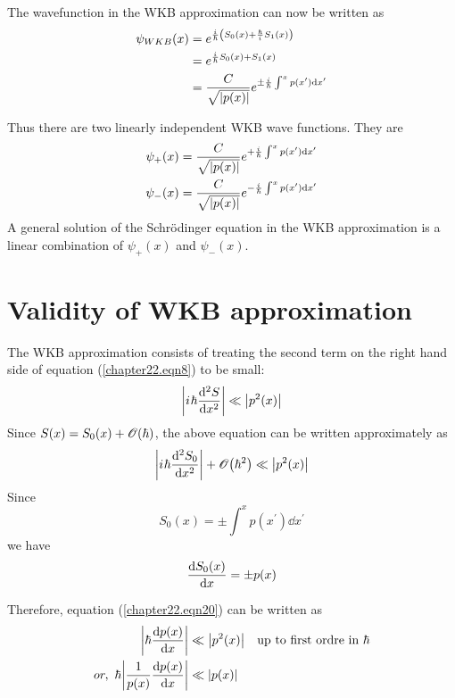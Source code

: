 The wavefunction in the WKB approximation can now be written as
\begin{align}
\psi_{WKB}(x) &= e^{\frac{{i\mkern1mu}}{\hbar} \qty(S_0(x) + \frac{\hbar}{{i\mkern1mu}} S_1(x))}  \nonumber\\
&= e^{\frac{{i\mkern1mu}}{\hbar} S_0(x) + S_1(x)} \nonumber\\
\label{chapter22.eqn16}
&= \frac{C}{\sqrt{\abs{p(x)}}} e^{\pm \frac{{i\mkern1mu}}{\hbar}\int^{x} p(x^\prime) \dd{x^\prime}}
\end{align}

Thus there are two linearly independent WKB wave functions. They are
\begin{align}
\label{chapter22.eqn17}
	\psi_+(x) &= \frac{C}{\sqrt{\abs{p(x)}}} e^{+ \frac{{i\mkern1mu}}{\hbar}\int^{x} p(x^\prime) \dd{x^\prime}} \\
\label{chapter22.eqn18}
	\psi_-(x) &= \frac{C}{\sqrt{\abs{p(x)}}} e^{- \frac{{i\mkern1mu}}{\hbar}\int^{x} p(x^\prime) \dd{x^\prime}}
\end{align}
A general solution of the Schr\"{o}dinger equation in the WKB approximation is a linear combination of $\psi_+(x)$ and $\psi_-(x)$.

\section{Validity of WKB approximation}
The WKB approximation consists of treating the second term on the right hand side of equation (\ref{chapter22.eqn8}) to be small:
\begin{equation}
\label{chapter22.eqn19}
\abs{{i\mkern1mu} \hbar \dv[2]{S}{x}} \ll \abs{p^2(x)}
\end{equation}
Since $S(x) = S_0(x) + \order{\hbar}$, the above equation can be written approximately as
\begin{equation}
\label{chapter22.eqn20}
\abs{\iu \hbar \dv[2]{S_0}{x}} + \order{\hbar^2} \ll \abs{p^2(x)}
\end{equation}
Since
\begin{equation}
S_0(x) = \pm \int^{x} p(x^\prime) \dd{x^\prime}
\end{equation}
we have
\begin{equation}
\dv{S_0(x)}{x} = \pm p(x)
\end{equation}

Therefore, equation (\ref{chapter22.eqn20}) can be written as
\begin{align}
\abs{\hbar\dv{p(x)}{x}} &\ll \abs{p^2(x)} \quad \text{up to first ordre in } \hbar \nonumber \\
\label{chapter22.eqn21}
or, \ \hbar \abs{\frac{1}{p(x)} \dv{p(x)}{x}} &\ll  \abs{p(x)}
\end{align}

